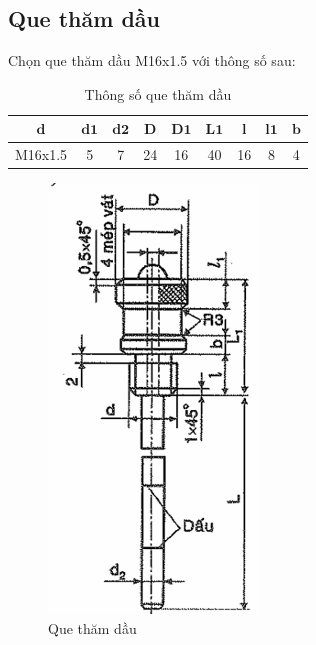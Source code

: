 \subsection{Que thăm dầu}
Chọn que thăm dầu M16x1.5 với thông số sau:
\begin{table}[H]
    \centering
    \begin{tabular}{|c|c|c|c|c|c|c|c|c|}
    \hline
    $\mathbf{d}$ & $\mathbf{d1}$ & $\mathbf{d2}$ & $\mathbf{D}$ & $\mathbf{D1}$ & $\mathbf{L1}$ & $\mathbf{l}$ & $\mathbf{l1}$ & $\mathbf{b}$ \\
    \hline
    M16x1.5 & 5 & 7 & 24 & 16 & 40 & 16 & 8 & 4 \\
    \hline
    \end{tabular}
    \caption{Thông số que thăm dầu}
\end{table}
\begin{figure}[H]
    \centering
    \includegraphics[width=0.5\textwidth]{pictures/quethamdau.png}
    \caption{Que thăm dầu}
\end{figure}
\cleardoublepage
